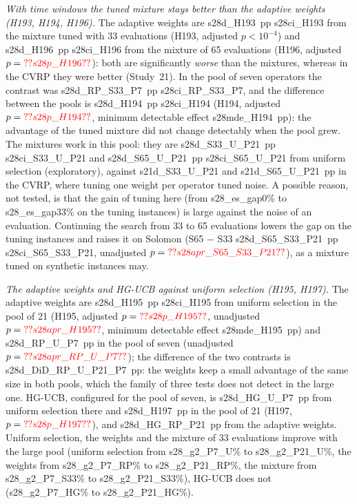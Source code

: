 \emph{With time windows the tuned mixture stays better than the adaptive weights (H193, H194, H196).} The adaptive weights are \num{s28d_H193}~pp \num{s28ci_H193} from the mixture tuned with 33 evaluations (H193, adjusted $p<10^{-4}$) and \num{s28d_H196}~pp \num{s28ci_H196} from the mixture of 65 evaluations (H196, adjusted $p=\num{s28p_H196}$): both are significantly \emph{worse} than the mixtures, whereas in the CVRP they were better (Study~21). In the pool of seven operators the contrast was \num{s28d_RP_S33_P7}~pp \num{s28ci_RP_S33_P7}, and the difference between the pools is \num{s28d_H194}~pp \num{s28ci_H194} (H194, adjusted $p=\num{s28p_H194}$, minimum detectable effect \num{s28mde_H194}~pp): the advantage of the tuned mixture did not change detectably when the pool grew. The mixtures work in this pool: they are \num{s28d_S33_U_P21}~pp \num{s28ci_S33_U_P21} and \num{s28d_S65_U_P21}~pp \num{s28ci_S65_U_P21} from uniform selection (exploratory), against \num{s21d_S33_U_P21} and \num{s21d_S65_U_P21}~pp in the CVRP, where tuning one weight per operator tuned noise. A possible reason, not tested, is that the gain of tuning here (from \num{s28_es_gap0}\% to \num{s28_es_gap33}\% on the tuning instances) is large against the noise of an evaluation. Continuing the search from 33 to 65 evaluations lowers the gap on the tuning instances and raises it on Solomon (S65 $-$ S33 \num{s28d_S65_S33_P21}~pp \num{s28ci_S65_S33_P21}, unadjusted $p=\num{s28apr_S65_S33_P21}$), as a mixture tuned on synthetic instances may.

\emph{The adaptive weights and HG-UCB against uniform selection (H195, H197).} The adaptive weights are \num{s28d_H195}~pp \num{s28ci_H195} from uniform selection in the pool of 21 (H195, adjusted $p=\num{s28p_H195}$, unadjusted $p=\num{s28apr_H195}$, minimum detectable effect \num{s28mde_H195}~pp) and \num{s28d_RP_U_P7}~pp in the pool of seven (unadjusted $p=\num{s28apr_RP_U_P7}$); the difference of the two contrasts is \num{s28d_DiD_RP_U_P21_P7}~pp: the weights keep a small advantage of the same size in both pools, which the family of three tests does not detect in the large one. HG-UCB, configured for the pool of seven, is \num{s28d_HG_U_P7}~pp from uniform selection there and \num{s28d_H197}~pp in the pool of 21 (H197, $p=\num{s28p_H197}$), and \num{s28d_HG_RP_P21}~pp from the adaptive weights. Uniform selection, the weights and the mixture of 33 evaluations improve with the large pool (uniform selection from \num{s28_g2_P7_U}\% to \num{s28_g2_P21_U}\%, the weights from \num{s28_g2_P7_RP}\% to \num{s28_g2_P21_RP}\%, the mixture from \num{s28_g2_P7_S33}\% to \num{s28_g2_P21_S33}\%), HG-UCB does not (\num{s28_g2_P7_HG}\% to \num{s28_g2_P21_HG}\%).

